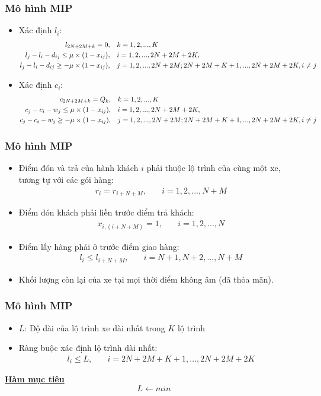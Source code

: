 \documentclass{beamer}
\begin{document}
	\begin{frame}
		\frametitle{Mô hình MIP}
		\begin{itemize}
			\item Xác định $l_i$:
			\begin{align}
				l_{2N+2M+k} = 0,\quad & k=1,2,...,K \\
				l_j - l_i -d_{ij}\leq \mu\times (1 - x_{ij}),\quad & i=1,2,...,2N+2M+2K, \\
				l_j - l_i -d_{ij}\geq -\mu\times (1 - x_{ij}),\quad & j=1,2,...,2N+2M;2N+2M+K+1,...,2N+2M+2K, i\ne j \notag
			\end{align}
			\item Xác định $c_i$:
			\begin{align}
				c_{2N+2M+k} = Q_k,\quad & k=1,2,...,K \\
				c_j - c_i - w_j\leq \mu\times (1 - x_{ij}),\quad & i=1,2,...,2N+2M+2K, \\
				c_j - c_i - w_j\geq -\mu\times (1 - x_{ij}),\quad & j=1,2,...,2N+2M;2N+2M+K+1,...,2N+2M+2K, i\ne j \notag \notag
			\end{align}
		\end{itemize}
	\end{frame}
	\begin{frame}
		\frametitle{Mô hình MIP}
		\begin{itemize}
			\item Điểm đón và trả của hành khách $i$ phải thuộc lộ trình của cùng một xe, tương tự với các gói hàng:
			\begin{align}
				r_i = r_{i+N+M},\quad & i=1,2,...,N+M
			\end{align}
			\item Điểm đón khách phải liền trước điểm trả khách:
			\begin{align}
				x_{i,(i+N+M)} = 1,\quad & i=1,2,...,N
			\end{align}
			\item Điểm lấy hàng phải ở trước điểm giao hàng:
			\begin{align}
				l_i \leq l_{i+N+M},\quad & i=N+1,N+2,...,N+M
			\end{align}
			\item Khối lượng còn lại của xe tại mọi thời điểm không âm (đã thỏa mãn).
		\end{itemize}
	\end{frame}
	\begin{frame}
		\frametitle{Mô hình MIP}
		\begin{itemize}
			\item $L$: Độ dài của lộ trình xe dài nhất trong $K$ lộ trình
			\item Ràng buộc xác định lộ trình dài nhất:
			\begin{align}
			l_i\leq L,\quad & i=2N+2M+K+1,...,2N+2M+2K
			\end{align}
		\end{itemize}
		\textbf{\underline{Hàm mục tiêu}}
		\begin{equation}
		L \leftarrow min
		\end{equation}
	\end{frame}
\end{document}
